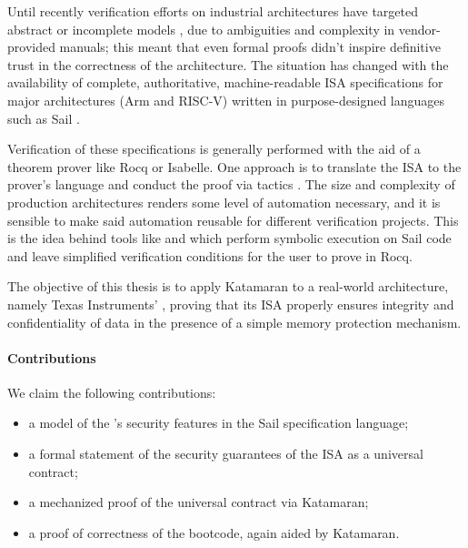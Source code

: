 Until recently verification efforts on industrial architectures have targeted abstract or incomplete models \cite{Georges2021}\cite{Jensen2013}\cite{Guanciale2016}, due to ambiguities and complexity in vendor-provided manuals; this meant that even formal proofs didn't inspire definitive trust in the correctness of the architecture. The situation has changed with the availability of complete, authoritative, machine-readable ISA specifications \cite{Armstrong2019} for major architectures (Arm and RISC-V) written in purpose-designed languages such as Sail \cite{Armstrong}.

Verification of these specifications is generally performed with the aid of a theorem prover like Rocq or Isabelle. One approach is to translate the ISA to the prover's language and conduct the proof via tactics \cite{Armstrong2019}\cite{Bauereiss2022}. The size and complexity of production architectures renders some level of automation necessary, and it is sensible to make said automation reusable for different verification projects. This is the idea behind tools like  \cite{Sammler2022} and  \cite{Huyghebaert2023} which perform symbolic execution on Sail code and leave simplified verification conditions for the user to prove in Rocq.



The objective of this thesis is to apply Katamaran to a real-world architecture, namely Texas Instruments' \msp, proving that its ISA properly ensures integrity and confidentiality of data in the presence of a simple memory protection mechanism.

\paragraph{Contributions}
We claim the following contributions:
\begin{itemize}
\item a model of the \msp's security features in the Sail specification language;
\item a formal statement of the security guarantees of the ISA as a universal contract;
\item a mechanized proof of the universal contract via Katamaran;
\item a proof of correctness of the \msp bootcode, again aided by Katamaran.
\end{itemize}

